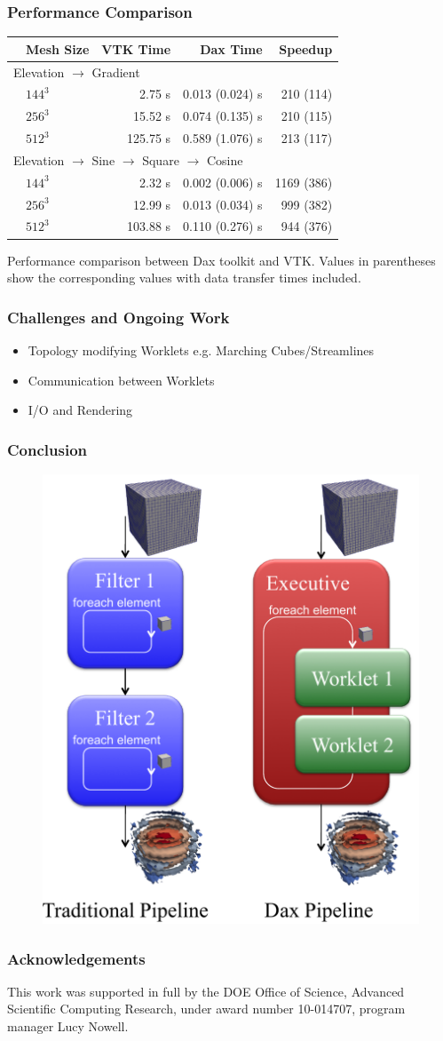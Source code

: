 \documentclass[brown]{beamer}
\begin{document}
\frame
{
  \frametitle{Performance Comparison}
  \begin{table}[htbp]
    \centering
    \label{tab:Results}
    \begin{tabular}{llrrr}
      \qquad & Mesh Size & VTK Time & Dax Time & Speedup \\
      \hline
      \multicolumn{5}{l}{Elevation $\rightarrow$ Gradient} \\
      & $144^3$ & 2.75 s & 0.013 (0.024) s & 210 (114) \\
      & $256^3$ &  15.52 s & 0.074 (0.135) s & 210 (115) \\
      & $512^3$ &  125.75 s & 0.589 (1.076) s &  213 (117) \\
      \multicolumn{5}{l}{Elevation $\rightarrow$ Sine $\rightarrow$ Square $\rightarrow$ Cosine} \\
      & $144^3$ & 2.32 s & 0.002 (0.006) s &  1169 (386) \\
      & $256^3$ &  12.99 s & 0.013 (0.034) s & 999 (382) \\
      & $512^3$ & 103.88 s & 0.110 (0.276) s &  944 (376) \\
    \end{tabular} 
  \end{table}
  {Performance comparison between Dax toolkit and VTK. Values in
  parentheses show the corresponding values with data transfer times
  included}.
}

\frame
{
  \frametitle{Challenges and Ongoing Work}
  \begin{itemize}
  \addtolength{\itemsep}{2\baselineskip}
  \item Topology modifying Worklets e.g. Marching Cubes/Streamlines
  \item Communication between Worklets
  \item I/O and Rendering
  \end{itemize}
}

\frame
{
  \frametitle{Conclusion}
  \begin{figure}
  \centering
  \includegraphics[width=.5\textwidth]{images/DaxPipelineVsTraditionalPipeline.pdf}
  \end{figure}
}

\frame
{
  \frametitle{Acknowledgements}
  This work was supported in full by the DOE Office of Science, Advanced
  Scientific Computing Research, under award number 10-014707, program manager
  Lucy Nowell.
}
\end{document}
